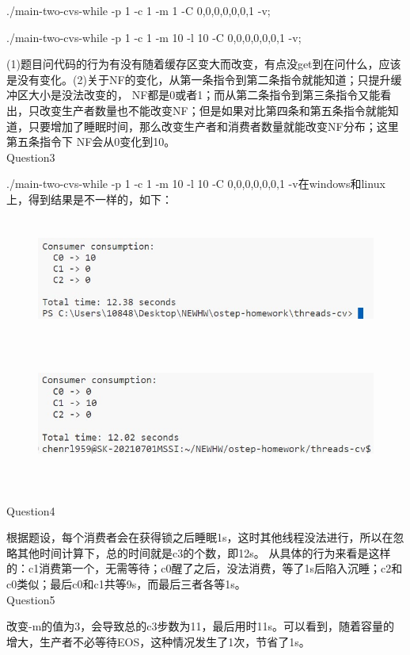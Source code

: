 \documentclass[11pt]{article}
\begin{document}
./main-two-cvs-while -p 1 -c 1 -m 1 -C 0,0,0,0,0,0,1 -v;\par
./main-two-cvs-while -p 1 -c 1 -m 10 -l 10 -C 0,0,0,0,0,0,1 -v;\par
(1)题目问代码的行为有没有随着缓存区变大而改变，有点没get到在问什么，应该是没有变化。(2)关于NF的变化，从第一条指令到第二条指令就能知道；只提升缓冲区大小是没法改变的，
NF都是0或者1；而从第二条指令到第三条指令又能看出，只改变生产者数量也不能改变NF；但是如果对比第四条和第五条指令就能知道，只要增加了睡眠时间，那么改变生产者和消费者数量就能改变NF分布；这里第五条指令下
NF会从0变化到10。\\
Question3\par
./main-two-cvs-while -p 1 -c 1 -m 10 -l 10 -C 0,0,0,0,0,0,1 -v在windows和linux上，得到结果是不一样的，如下：
\begin{figure}[h]
    \centering
    \includegraphics[height=4cm]{hw8-4.jpg}
\end{figure}
\begin{figure}[h]
    \centering
    \includegraphics[height=4cm]{hw8-5.jpg}
\end{figure}
\\
Question4\par
根据题设，每个消费者会在获得锁之后睡眠1s，这时其他线程没法进行，所以在忽略其他时间计算下，总的时间就是c3的个数，即12s。
从具体的行为来看是这样的：c1消费第一个，无需等待；c0醒了之后，没法消费，等了1s后陷入沉睡；c2和c0类似；最后c0和c1共等9s，而最后三者各等1s。\\
Question5\par
改变-m的值为3，会导致总的c3步数为11，最后用时11s。可以看到，随着容量的增大，生产者不必等待EOS，这种情况发生了1次，节省了1s。\\
\end{document}
